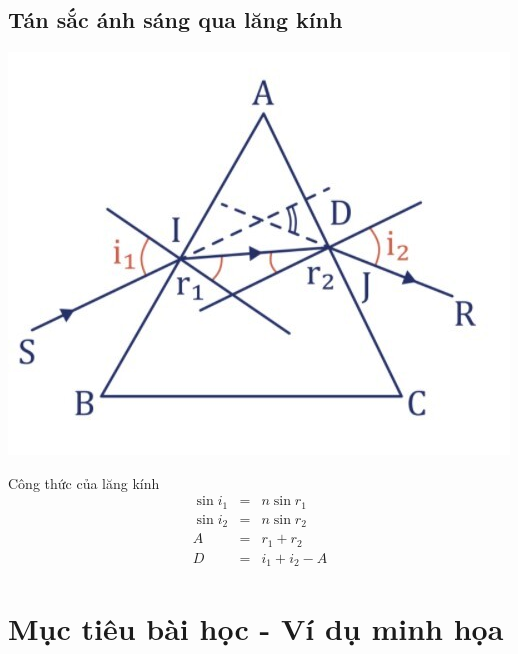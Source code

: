 \subsection{Tán sắc ánh sáng qua lăng kính}
\begin{center}
	\includegraphics[scale=0.5]{../figs/VN12-PH-32-A-016-1-2.jpg}
\end{center}
Công thức của lăng kính
\begin{equation}\label{eq:tansac3}
	\begin{array}{rcl}
		\sin i_1&=&n\sin r_1\\
		\sin i_2&=&n\sin r_2\\
		A&=&r_1+r_2\\
		D&=&i_1+i_2-A
	\end{array}
\end{equation}

\section{Mục tiêu bài học - Ví dụ minh họa}

